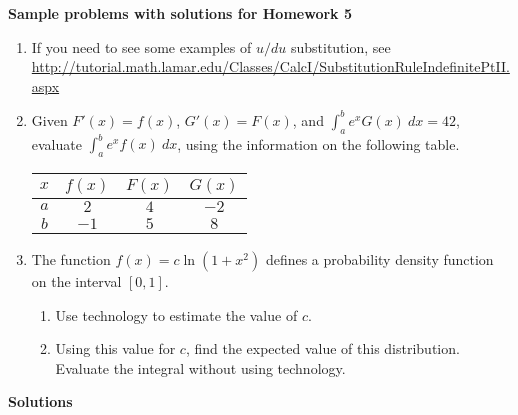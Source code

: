 \documentclass{article}
\begin{document}
\begin{center}
\textbf{
    Sample problems with solutions for Homework 5}
\end{center}
    \begin{enumerate}
    \item If you need to see some examples of $u/du$ substitution, see\\
    \url{http://tutorial.math.lamar.edu/Classes/CalcI/SubstitutionRuleIndefinitePtII.aspx}
                        \item Given $F'(x)=f(x)$, $G'(x) = F(x)$, and $\int_a^b e^x G(x)\ dx = 42$, evaluate $\int_a^b e^xf(x)\ dx$, using the information on the following table. \\
                        \begin{center}
                        \begin{tabular}{|c|c|c|c|}
                        \hline
                        $x$ & $f(x)$ & $F(x)$ & $G(x)$  \\
                        \hline
                        $a$ & $2$ & $4$ & $-2$\\
                        \hline
                        $b$ & $-1$ & $5$ & $8$ \\
                        \hline 
                        \end{tabular}
                        \end{center}
                        \medskip
                    \item The function $f(x) = c\ln(1+x^2)$ defines a probability density function on the interval $[0, 1]$.
                    \begin{enumerate}
                        \item Use technology to estimate the value of $c$.
                        \item Using this value for $c$, find the expected value of this distribution. Evaluate the integral without using technology.
                    
                    \end{enumerate}
    \end{enumerate}
    \begin{center}
        \textbf{\Large{Solutions}}
    \end{center}
\end{document}
